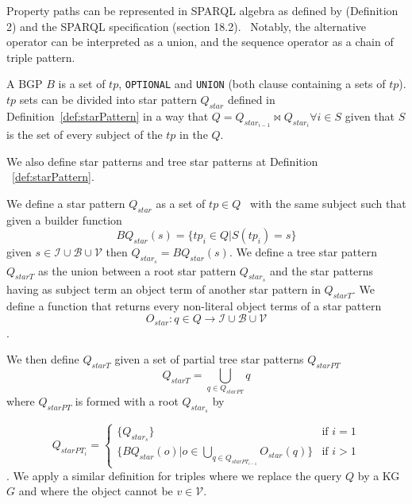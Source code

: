Property paths can be represented in SPARQL algebra as defined by \citeauthor{Kostylev2015} (Definition 2) and the SPARQL specification (section 18.2).~
Notably, the alternative operator can be interpreted as a union, and the sequence operator as a chain of triple pattern.

\begin{definition}[BGP]\label{def:bgp}
 A BGP $B$ is a set of $tp$, \texttt{OPTIONAL} and \texttt{UNION} (both clause containing a sets of $tp$).
 $tp$ sets can be divided into star pattern $Q_{star}$ defined in Definition~\ref{def:starPattern} in a way 
 that $Q = Q_{star_{i-1}} \bowtie Q_{star_i} \forall i \in S$ given that $S$ is the set of every subject of the $tp$ in the $Q$.
\end{definition}
\fi

We also define star patterns and tree star patterns at Definition ~\ref{def:starPattern}.

\begin{definition}\label{def:starPattern}
    We define a star pattern $Q_{star}$ as a set of $tp \in Q$~\cite{Karim2020} with the same subject such that 
    given a builder function 
    \begin{equation}
        BQ_{star}(s) = \{tp_i \in Q| S(tp_i) = s\}
    \end{equation}
    given $s \in \mathcal{I} \cup \mathcal{B} \cup \mathcal{V}$ then $Q_{star_s} = BQ_{star}(s)$.
    We define a tree star pattern $Q_{starT}$ as the union between a root star pattern $Q_{star_s}$
    and the star patterns having as subject term an object term of another star pattern in $Q_{starT}$.
    We define a function that returns every non-literal object terms of a star pattern
    \begin{equation}
        O_{star}: q \in Q \rightarrow  \mathcal{I} \cup \mathcal{B} \cup \mathcal{V}
    \end{equation}
    .
    
    We then define $Q_{starT}$ given a  set of partial tree star patterns $Q_{starPT}$
    \begin{equation}
        Q_{starT} = \bigcup_{q \in Q_{starPT}} q
    \end{equation}
    where $Q_{starPT}$ is formed with a root $Q_{star_s}$ by

    \begin{equation}
            Q_{starPT_i} =
        \begin{cases}
            \{Q_{star_s}\} & \text{if } i = 1 \\
            \{BQ_{star}(o)| o \in \bigcup_{q \in Q_{starPT_{i-1}}} O_{star}(q)\} & \text{if } i>1
        \end{cases}
    \end{equation}
    . 
    We apply a similar definition for triples where we replace the query $Q$ by a KG $G$ and where the object 
    cannot be $v \in \mathcal{V}$.

\end{definition}

